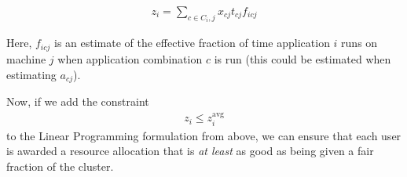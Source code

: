 \documentclass{article}
\begin{document}
\begin{eqnarray}
z_i = \sum_{c \in C_i, j} x_{cj} t_{cj} f_{icj} \nonumber
\end{eqnarray}

Here, $f_{icj}$ is an estimate of the effective fraction of time application $i$
runs on machine $j$ when application combination $c$ is run (this could be estimated
when estimating $a_{cj}$).

Now, if we add the constraint
\begin{eqnarray}
z_i \leq z_i^{\text{avg}} \nonumber
\end{eqnarray}
to the Linear Programming formulation from above, we can ensure that each user
is awarded a resource allocation that is \emph{at least} as good as being given
a fair fraction of the cluster.
\end{document}
